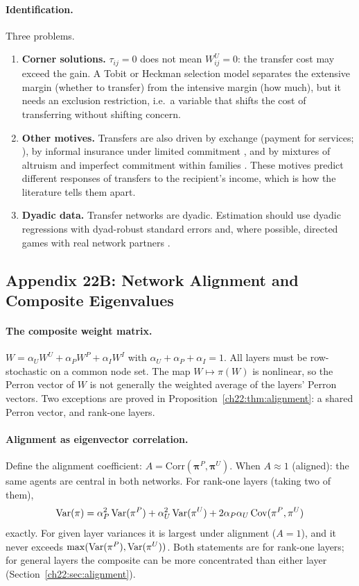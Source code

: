 \documentclass[../structural_economics_book.tex]{subfiles}
\begin{document}
\paragraph{Identification.} Three problems.
\begin{enumerate}
\item \textbf{Corner solutions.} $\tau_{ij} = 0$ does not mean $W^U_{ij} = 0$: the transfer cost may exceed the gain. A Tobit or Heckman selection model separates the extensive margin (whether to transfer) from the intensive margin (how much), but it needs an exclusion restriction, i.e.\ a variable that shifts the cost of transferring without shifting concern.
\item \textbf{Other motives.} Transfers are also driven by exchange (payment for services; \citealp{cox1987motives}), by informal insurance under limited commitment \citep{ligon2002informal}, and by mixtures of altruism and imperfect commitment within families \citep{foster2001imperfect}. These motives predict different responses of transfers to the recipient's income, which is how the literature tells them apart.
\item \textbf{Dyadic data.} Transfer networks are dyadic. Estimation should use dyadic regressions with dyad-robust standard errors \citep{fafchamps2007formation} and, where possible, directed games with real network partners \citep{leider2009directed,ligon2012motives}.
\end{enumerate}


\subsection*{Appendix 22B: Network Alignment and Composite Eigenvalues}
\label{ch22:app:alignment}

\paragraph{The composite weight matrix.} $W = \alpha_U W^U + \alpha_P W^P + \alpha_I W^I$ with $\alpha_U + \alpha_P + \alpha_I = 1$. All layers must be row-stochastic on a common node set. The map $W \mapsto \pi(W)$ is nonlinear, so the Perron vector of $W$ is not generally the weighted average of the layers' Perron vectors. Two exceptions are proved in Proposition~\ref{ch22:thm:alignment}: a shared Perron vector, and rank-one layers.

\paragraph{Alignment as eigenvector correlation.} Define the alignment coefficient: $A = \text{Corr}(\boldsymbol{\pi}^P, \boldsymbol{\pi}^U)$. When $A \approx 1$ (aligned): the same agents are central in both networks. For rank-one layers (taking two of them),
\[
\operatorname{Var}(\pi) = \alpha_P^2\operatorname{Var}(\pi^P) + \alpha_U^2\operatorname{Var}(\pi^U) + 2\alpha_P\alpha_U\operatorname{Cov}(\pi^P, \pi^U)
\]
exactly. For given layer variances it is largest under alignment ($A = 1$), and it never exceeds $\max(\operatorname{Var}(\pi^P), \operatorname{Var}(\pi^U))$. Both statements are for rank-one layers; for general layers the composite can be more concentrated than either layer (Section~\ref{ch22:sec:alignment}).
\end{document}

